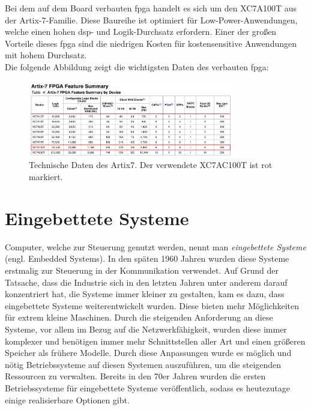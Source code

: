 Bei dem auf dem Board verbauten \ac{fpga} handelt es sich um den  XC7A100T aus der Artix-7-Familie. Diese Baureihe ist optimiert für Low-Power-Anwendungen, welche einen hohen \ac{dsp}- und Logik-Durchsatz erfordern. Einer der großen Vorteile
dieses \ac{fpga} sind die niedrigen Kosten für kostensensitive Anwendungen mit hohem Durchsatz.\\
Die folgende Abbildung zeigt die wichtigsten Daten des verbauten \ac{fpga}:~\cite{artix7}\\


\begin{figure}[H]
\centering
\includegraphics[width=0.8\textwidth]{Hauptteil/artix7.png}
\caption{Technische Daten des Artix7. Der verwendete XC7AC100T ist rot markiert.~\cite{artix7}}\label{fig:artix7}
\end{figure}

\section{Eingebettete Systeme}\label{kap:eingebettetesysteme}

Computer, welche zur Steuerung genutzt werden, nennt man \emph{eingebettete Systeme} (engl. Embedded Systems). In den späten 1960 Jahren wurden diese Systeme erstmalig zur Steuerung in der Kommunikation verwendet. Auf Grund der Tatsache,
dass die Industrie sich in den letzten Jahren unter anderem darauf konzentriert hat, die Systeme immer kleiner zu gestalten, kam es dazu, dass eingebettete Systeme weiterentwickelt wurden. Diese bieten mehr Möglichkeiten für extrem kleine Maschinen.
Durch die steigenden Anforderung an diese Systeme, vor allem im Bezug auf die Netzwerkfähigkeit, wurden diese immer komplexer und benötigen immer mehr Schnittstellen aller Art und einen größeren Speicher als frühere Modelle. Durch diese Anpassungen wurde es
möglich und nötig Betriebssysteme auf diesen Systemen auszuführen, um die steigenden Ressourcen zu verwalten. Bereits in den 70er Jahren wurden die ersten Betriebssysteme für eingebettete Systeme veröffentlich, sodass es heutezutage einige
realisierbare Optionen gibt.\cite{ibm}\\

